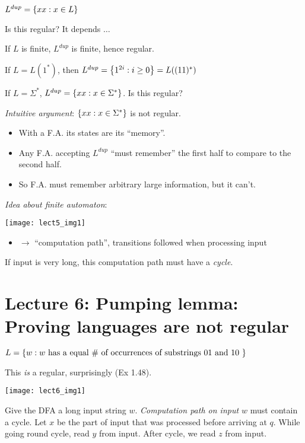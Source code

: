 \begin{example}
    $L^{dup} = \left \{ xx: x \in L \right \}$

    Is this regular? It depends $\ldots$

    If $L$ is finite, $L^{dup}$ is finite, hence regular.

    If $L = L(1^*)$, then $L^{dup} = \left \{ 1^{2i}: i \geq 0 \right \} = L((11)^*)$

    If $L = \Sigma^*$, $L^{dup} = \left \{ xx: x \in \Sigma^* \right \}$. Is this regular?

    \emph{Intuitive argument}: $\left \{ xx: x \in \Sigma^* \right \}$ is not regular.

    \begin{itemize}
        \item With a F.A. its states are its ``memory''.
        \item Any F.A. accepting $L^{dup}$ ``must remember'' the first half to compare to the second half.
        \item So F.A. must remember arbitrary large information, but it can't.
    \end{itemize}
\end{example}

\emph{Idea about finite automaton}:

\begin{unnumfigure}
    \texttt{[image: lect5\_img1]}
\end{unnumfigure}

\begin{itemize}
    \item $\rightarrow$ ``computation path'', transitions followed when processing input
\end{itemize}

If input is very long, this computation path must have a \emph{cycle}.

\section*{Lecture 6: Pumping lemma: Proving languages are not regular}

$L = \left \{ w: w \text{ has a equal \# of occurrences of substrings 01 and 10 } \right \}$

This \emph{is} a regular, surprisingly (Ex 1.48).

\begin{unnumfigure}
    \texttt{[image: lect6\_img1]}
\end{unnumfigure}

Give the DFA a long input string $w$. \emph{Computation path on input $w$} must contain a cycle. Let $x$ be the part of input that was processed before arriving at $q$. While going round cycle, read $y$ from input. After cycle, we read $z$ from input.

